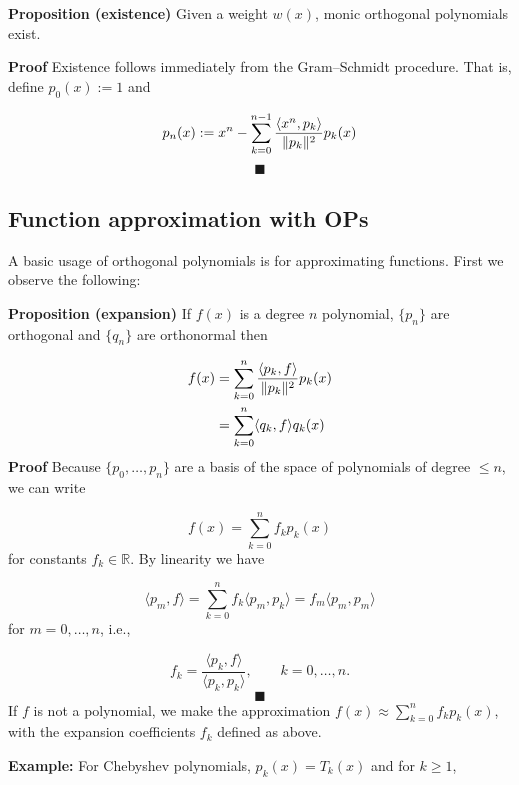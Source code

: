 \documentclass[12pt,a4paper]{article}
\def\bbR{ {\mathbb R} }
\def\endash{–}
\begin{document}
\textbf{Proposition (existence)} Given a weight $w(x)$, monic orthogonal polynomials exist.

\textbf{Proof}  Existence follows immediately from the Gram\ensuremath{\endash}Schmidt procedure. That is, define $p_0(x) := 1$ and

\[
p_n(x) := x^n - \ensuremath{\sum}_{k=0}^{n-1} {\ensuremath{\langle}x^n,p_k\ensuremath{\rangle} \over \|p_k\|^2} p_k(x)
\]
\[
\blacksquare
\]
\subsection{Function approximation with OPs}
A basic usage of orthogonal polynomials is for approximating functions. First we observe the following:

\textbf{Proposition (expansion)} If $f(x)$ is a degree $n$ polynomial, $\{p_n\}$ are orthogonal and $\{q_n\}$ are orthonormal then


\begin{align*}
f(x) &= \sum_{k=0}^n {\ensuremath{\langle}p_k,f\ensuremath{\rangle} \over \|p_k\|^2} p_k(x) \\
     &    = \sum_{k=0}^n \ensuremath{\langle}q_k,f\ensuremath{\rangle} q_k(x)
\end{align*}
\textbf{Proof} Because $\{p_0,\ensuremath{\ldots},p_n \}$ are a basis of the space of polynomials of degree $\leq n$, we can write

\[
f(x) = \sum_{k=0}^n f_k p_k(x)
\]
for constants $f_k \ensuremath{\in} \ensuremath{\bbR}$. By linearity we have

\[
\ensuremath{\langle}p_m,f\ensuremath{\rangle} = \sum_{k=0}^n f_k \ensuremath{\langle}p_m,p_k\ensuremath{\rangle}= f_m \ensuremath{\langle}p_m,p_m\ensuremath{\rangle}
\]
for $m = 0, \ldots, n$, i.e.,

\[
f_k = \frac{\langle p_k,f \rangle}{\langle p_k,p_k \rangle}, \qquad k = 0, \ldots, n.
\]
\[
\blacksquare
\]
If $f$ is not a polynomial, we make the approximation $f(x) \approx \sum_{k=0}^n f_k p_k(x)$, with the expansion coefficients $f_k$ defined as above. 

\textbf{Example:}  For Chebyshev polynomials, $p_k(x) = T_k(x)$ and for $k \geq 1$,
\end{document}
